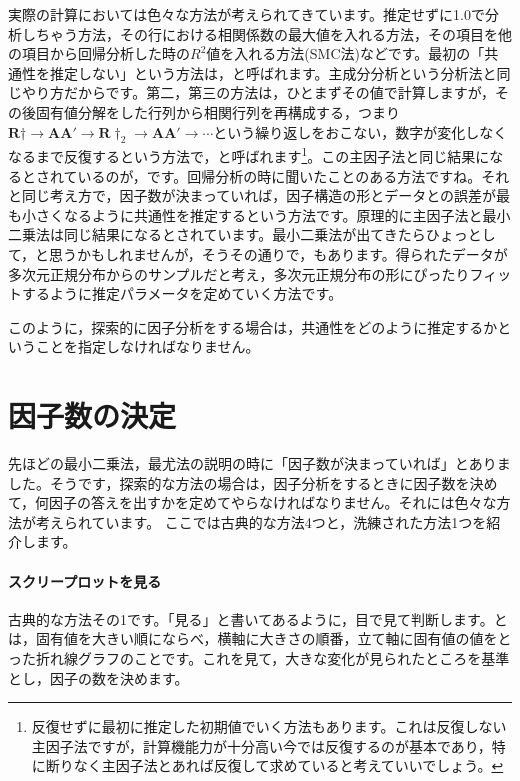 \documentclass{ltjsbook}
\begin{document}
実際の計算においては色々な方法が考えられてきています。推定せずに1.0で分析しちゃう方法，その行における相関係数の最大値を入れる方法，その項目を他の項目から回帰分析した時の$R^2$値を入れる方法(SMC法)などです。最初の「共通性を推定しない」という方法は，と呼ばれます。主成分分析という分析法と同じやり方だからです。第二，第三の方法は，ひとまずその値で計算しますが，その後固有値分解をした行列から相関行列を再構成する，つまり$\bm{R}\dagger \to \bm{AA'} \to \bm{R}\dagger_2 \to \bm{AA'} \to \cdots $という繰り返しをおこない，数字が変化しなくなるまで反復するという方法で，と呼ばれます\footnote{反復せずに最初に推定した初期値でいく方法もあります。これは反復しない主因子法ですが，計算機能力が十分高い今では反復するのが基本であり，特に断りなく主因子法とあれば反復して求めていると考えていいでしょう。}。この主因子法と同じ結果になるとされているのが，です。回帰分析の時に聞いたことのある方法ですね。それと同じ考え方で，因子数が決まっていれば，因子構造の形とデータとの誤差が最も小さくなるように共通性を推定するという方法です。原理的に主因子法と最小二乗法は同じ結果になるとされています。最小二乗法が出てきたらひょっとして，と思うかもしれませんが，そうその通りで，もあります。得られたデータが多次元正規分布からのサンプルだと考え，多次元正規分布の形にぴったりフィットするように推定パラメータを定めていく方法です。

このように，探索的に因子分析をする場合は，共通性をどのように推定するかということを指定しなければなりません。

\section{因子数の決定}
先ほどの最小二乗法，最尤法の説明の時に「因子数が決まっていれば」とありました。そうです，探索的な方法の場合は，因子分析をするときに因子数を決めて，何因子の答えを出すかを定めてやらなければなりません。それには色々な方法が考えられています。
ここでは古典的な方法4つと，洗練された方法1つを紹介します。
\paragraph{スクリープロットを見る}古典的な方法その1です。「見る」と書いてあるように，目で見て判断します。とは，固有値を大きい順にならべ，横軸に大きさの順番，立て軸に固有値の値をとった折れ線グラフのことです。これを見て，大きな変化が見られたところを基準とし，因子の数を決めます。
\end{document}
